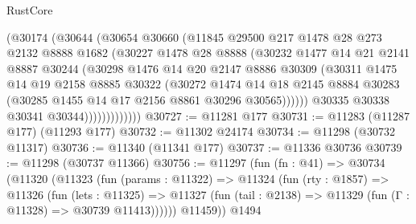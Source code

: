 \begin{lexlean}{RustCore}
\begin{coremodule}
                      (@30174
                        (@30644
                          (@30654
                            @30660
                            (@11845
                              @29500
                              @217
                              @1478
                              @28
                              @273
                              @2132
                              @8888
                              @1682
                              (@30227
                                @1478
                                @28
                                @8888
                                (@30232
                                  @1477
                                  @14
                                  @21
                                  @2141
                                  @8887
                                  @30244
                                  (@30298
                                    @1476
                                    @14
                                    @20
                                    @2147
                                    @8886
                                    @30309
                                    (@30311
                                      @1475
                                      @14
                                      @19
                                      @2158
                                      @8885
                                      @30322
                                      (@30272
                                        @1474
                                        @14
                                        @18
                                        @2145
                                        @8884
                                        @30283
                                        (@30285 @1455 @14 @17 @2156 @8861 @30296 @30565))))))
                              @30335
                              @30338
                              @30341
                              @30344)))))))))))))
@30727 := @11281 @177
@30731 := @11283 (@11287 @177) (@11293 @177)
@30732 := @11302 @24174
@30734 := @11298 (@30732 @11317)
@30736 := @11340 (@11341 @177)
@30737 := @11336 @30736
@30739 := @11298 (@30737 @11366)
@30756 := @11297
    (fun (fn : @41) =>
    @30734
      (@11320
        (@11323
          (fun (params : @11322) =>
          @11324
            (fun (rty : @1857) =>
            @11326
              (fun (lets : @11325) =>
              @11327 (fun (tail : @2138) => @11329 (fun (Γ : @11328) => @30739 @11413))))))
        @11459))
    @1494

\end{coremodule}
\end{lexlean}
